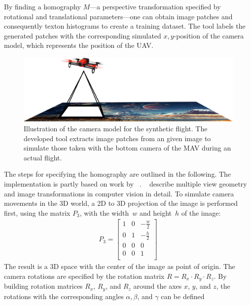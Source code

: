 \documentclass[11pt]{report}
\begin{document}
By finding a homography $M$---a perspective transformation specified
by rotational and translational parameters---one can obtain image
patches and consequently texton histograms to create a training
dataset. The tool labels the generated patches with the corresponding
simulated $x,y$-position of the camera model, which represents the
position of the UAV.

\begin{figure}[h]
\begin{center}
\includegraphics[width=0.672\columnwidth]{camera_model}
\caption{{\label{fig:cammodel} Illustration of the camera model for
    the synthetic flight. The developed tool extracts image patches
    from an given image to simulate those taken with the bottom camera
    of the MAV during an actual flight.}}
\end{center}
\end{figure}
The steps for specifying the homography are outlined in the
following. The implementation is partly based on work by
\citeauthor{jepson}~\cite{jepson}. \citeauthor{hartley2003multiple}~\cite{hartley2003multiple}
describe multiple view geometry and image transformations in computer
vision in detail.  To simulate camera movements in the 3D world, a 2D
to 3D projection of the image is performed first, using the matrix
$P_3$, with the width~$w$ and height~$h$ of the image:
\begin{align*}
  P_3 = \begin{bmatrix}
  1             & 0            & -\frac{w}{2}      \\
  0             & 1            & -\frac{h}{2}      \\
  0             & 0            & 0                 \\
  0             & 0            & 1                 \\
  \end{bmatrix}
\end{align*}
The result is a 3D space with the center of the image as point of
origin. The camera rotations are specified by the rotation matrix
$R = R_x \cdot R_y \cdot R_z$. By building rotation matrices $R_x$,
$R_y$, and $R_z$ around the axes $x$, $y$, and $z$, the rotations with
the corresponding angles $\alpha, \beta$, and $\gamma$ can be defined
\end{document}
